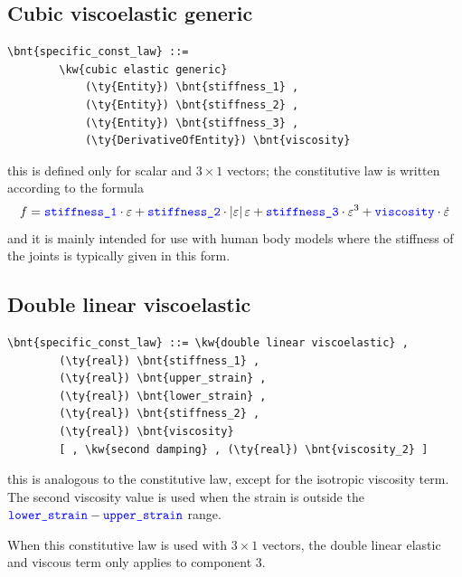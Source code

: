 \subsection{Cubic viscoelastic generic}
\begin{Verbatim}[commandchars=\\\{\}]
    \bnt{specific_const_law} ::= 
        \kw{cubic elastic generic}
            (\ty{Entity}) \bnt{stiffness_1} ,
            (\ty{Entity}) \bnt{stiffness_2} ,
            (\ty{Entity}) \bnt{stiffness_3} ,
            (\ty{DerivativeOfEntity}) \bnt{viscosity}
\end{Verbatim}
this is defined only for scalar and $3 \times 1$ vectors; the constitutive
law is written according to the formula
\begin{displaymath}
	f = \textcolor{blue}{\texttt{stiffness\_1}} \cdot \varepsilon
	+ \textcolor{blue}{\texttt{stiffness\_2}} \cdot \left| \varepsilon \right|\varepsilon
	+ \textcolor{blue}{\texttt{stiffness\_3}} \cdot \varepsilon^3
	+ \textcolor{blue}{\texttt{viscosity}} \cdot \dot{\varepsilon}
\end{displaymath}
and it is mainly intended for use with human body models 
where the stiffness of the joints is typically given in this form.

\subsection{Double linear viscoelastic}
\begin{Verbatim}[commandchars=\\\{\}]
    \bnt{specific_const_law} ::= \kw{double linear viscoelastic} ,
        (\ty{real}) \bnt{stiffness_1} ,
        (\ty{real}) \bnt{upper_strain} ,
        (\ty{real}) \bnt{lower_strain} ,
        (\ty{real}) \bnt{stiffness_2} ,
        (\ty{real}) \bnt{viscosity}
        [ , \kw{second damping} , (\ty{real}) \bnt{viscosity_2} ]
\end{Verbatim}
this is analogous to the  constitutive law,
except for the isotropic viscosity term.
The second viscosity value is used when the strain is outside the
$\textcolor{blue}{\texttt{lower\_strain}} - \textcolor{blue}{\texttt{upper\_strain}}$ range.

When this constitutive law is used with $3 \times 1$ vectors, 
the double linear elastic and viscous term only applies to component 3.
  
